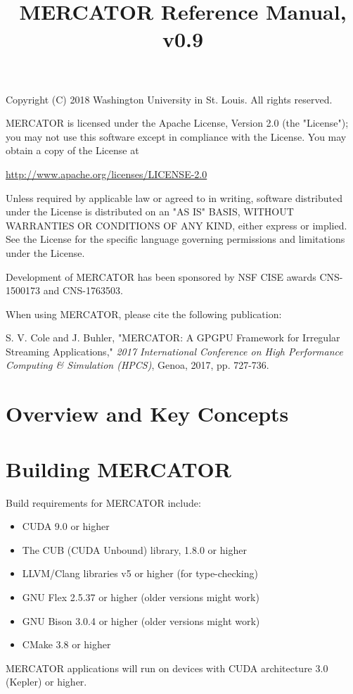 \documentclass[11pt]{article}
\title{MERCATOR Reference Manual, v0.9}
\begin{document}
\maketitle

Copyright (C) 2018 Washington University in St. Louis.  All rights
reserved.

MERCATOR is licensed under the Apache License, Version 2.0 (the
"License"); you may not use this software except in compliance with
the License.  You may obtain a copy of the License at

  \url{http://www.apache.org/licenses/LICENSE-2.0}
	
Unless required by applicable law or agreed to in writing, software
distributed under the License is distributed on an "AS IS" BASIS,
WITHOUT WARRANTIES OR CONDITIONS OF ANY KIND, either express or implied.
See the License for the specific language governing permissions and
limitations under the License.


Development of MERCATOR has been sponsored by NSF CISE awards
CNS-1500173 and CNS-1763503.

When using MERCATOR, please cite the following publication:

S. V. Cole and J. Buhler, "MERCATOR: A GPGPU Framework for Irregular
Streaming Applications," \textit{2017 International Conference on High
  Performance Computing \& Simulation (HPCS)}, Genoa, 2017,
pp. 727-736.

\newpage

\section{Overview and Key Concepts}

\section{Building MERCATOR}

Build requirements for MERCATOR include:
\begin{itemize}

\item CUDA 9.0 or higher

\item The CUB (CUDA Unbound) library, 1.8.0 or higher

\item LLVM/Clang libraries v5 or higher (for type-checking)

\item GNU Flex 2.5.37 or higher (older versions might work)

\item GNU Bison 3.0.4 or higher (older versions might work)

\item CMake 3.8 or higher

\end{itemize}
MERCATOR applications will run on devices with CUDA architecture 3.0
(Kepler) or higher.
\end{document}
